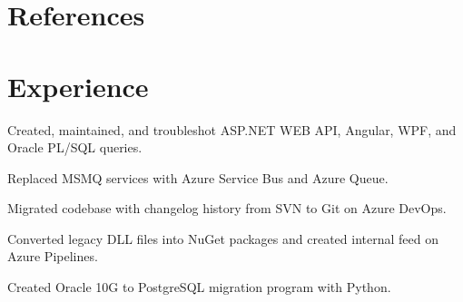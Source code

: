 \documentclass[letterpaper]{cv_12} %
\begin{document}
\begin{newpage}
\begin{minipage}[t]{0.39\textwidth}
    \sectionspace%
    \sectionspace%

    

    \section{References}


    \sectionspace%


\end{minipage} %
\hfill
%
%
\begin{minipage}[t]{0.59\textwidth}%


    \section{Experience}


    \vspace{\topsep}
    \begin{tightitemize}
        \item Created, maintained, and troubleshot ASP.NET WEB API, Angular,
        WPF, and Oracle PL/SQL queries.
        \item Replaced MSMQ services with Azure Service Bus and Azure Queue.
        \item Migrated codebase with changelog history from SVN to Git on Azure
        DevOps.
        \item Converted legacy DLL files into NuGet packages and created
        internal feed on Azure Pipelines.
        \item Created Oracle 10G to PostgreSQL migration program
        with Python.
    \end{tightitemize}


\end{minipage}
\end{newpage}
\end{document}
